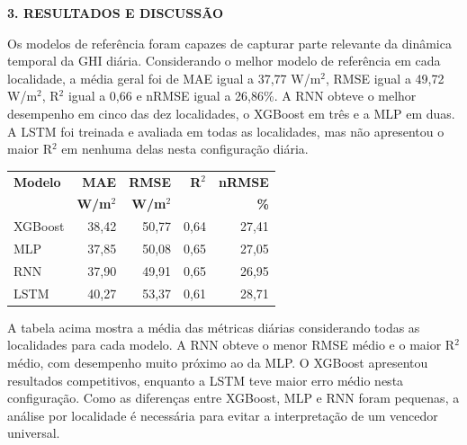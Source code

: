 \documentclass[12pt,a4paper]{article}
\begin{document}
\vspace{12pt}

\noindent\textbf{3. RESULTADOS E DISCUSSÃO}

Os modelos de referência foram capazes de capturar parte relevante da dinâmica temporal da GHI diária. Considerando o melhor modelo de referência em cada localidade, a média geral foi de MAE igual a 37,77 W/m$^2$, RMSE igual a 49,72 W/m$^2$, R$^2$ igual a 0,66 e nRMSE igual a 26,86\%. A RNN obteve o melhor desempenho em cinco das dez localidades, o XGBoost em três e a MLP em duas. A LSTM foi treinada e avaliada em todas as localidades, mas não apresentou o maior R$^2$ em nenhuma delas nesta configuração diária.

\vspace{6pt}

\begin{center}
\small
\begin{tabular}{lrrrr}
\toprule
\textbf{Modelo} & \textbf{MAE} & \textbf{RMSE} & \textbf{R$^2$} & \textbf{nRMSE} \\
 & \textbf{W/m$^2$} & \textbf{W/m$^2$} & & \textbf{\%} \\
\midrule
XGBoost & 38,42 & 50,77 & 0,64 & 27,41 \\
MLP & 37,85 & 50,08 & 0,65 & 27,05 \\
RNN & 37,90 & 49,91 & 0,65 & 26,95 \\
LSTM & 40,27 & 53,37 & 0,61 & 28,71 \\
\bottomrule
\end{tabular}
\end{center}

\vspace{6pt}

A tabela acima mostra a média das métricas diárias considerando todas as localidades para cada modelo. A RNN obteve o menor RMSE médio e o maior R$^2$ médio, com desempenho muito próximo ao da MLP. O XGBoost apresentou resultados competitivos, enquanto a LSTM teve maior erro médio nesta configuração. Como as diferenças entre XGBoost, MLP e RNN foram pequenas, a análise por localidade é necessária para evitar a interpretação de um vencedor universal.

\vspace{6pt}
\end{document}
